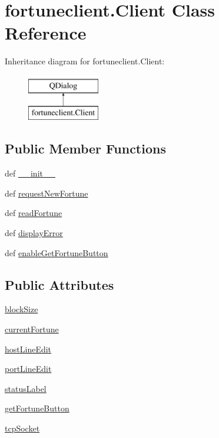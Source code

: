 \hypertarget{classfortuneclient_1_1Client}{}\section{fortuneclient.\+Client Class Reference}
\label{classfortuneclient_1_1Client}
Inheritance diagram for fortuneclient.\+Client\+:\begin{figure}[H]
\begin{center}
\leavevmode
\includegraphics[height=2.000000cm]{classfortuneclient_1_1Client}
\end{center}
\end{figure}
\subsection*{Public Member Functions}
\begin{DoxyCompactItemize}
\item 
def \hyperlink{classfortuneclient_1_1Client_acc788f3d12a24fe223d12abbc53c1aa0}{\+\_\+\+\_\+init\+\_\+\+\_\+}
\item 
def \hyperlink{classfortuneclient_1_1Client_a9757b391be1fab1067e476c6151bb4d6}{request\+New\+Fortune}
\item 
def \hyperlink{classfortuneclient_1_1Client_a9d5cd3cf41a50860aafbc361c45e6c4e}{read\+Fortune}
\item 
def \hyperlink{classfortuneclient_1_1Client_ac1f014008ee2f40d325ad4b8f7fb500b}{display\+Error}
\item 
def \hyperlink{classfortuneclient_1_1Client_ae70ebd26f0e17d813045058f306ece6a}{enable\+Get\+Fortune\+Button}
\end{DoxyCompactItemize}
\subsection*{Public Attributes}
\begin{DoxyCompactItemize}
\item 
\hyperlink{classfortuneclient_1_1Client_a27893794a0a7ca2250017803c16f802e}{block\+Size}
\item 
\hyperlink{classfortuneclient_1_1Client_a7acd0f9f18083287ba5ea680f48cb2b7}{current\+Fortune}
\item 
\hyperlink{classfortuneclient_1_1Client_a6cdd1eb46782ec49eeec6d5831d361a1}{host\+Line\+Edit}
\item 
\hyperlink{classfortuneclient_1_1Client_a8d67dc2fd1f84b090b0f3a2690d56c8b}{port\+Line\+Edit}
\item 
\hyperlink{classfortuneclient_1_1Client_a78d292082974d3d2214dc6a4fa822973}{status\+Label}
\item 
\hyperlink{classfortuneclient_1_1Client_a0d40b61fc650bccd4af05e057da9f84d}{get\+Fortune\+Button}
\item 
\hyperlink{classfortuneclient_1_1Client_ad57d86327e233073652e8ad8644e33a6}{tcp\+Socket}
\end{DoxyCompactItemize}


